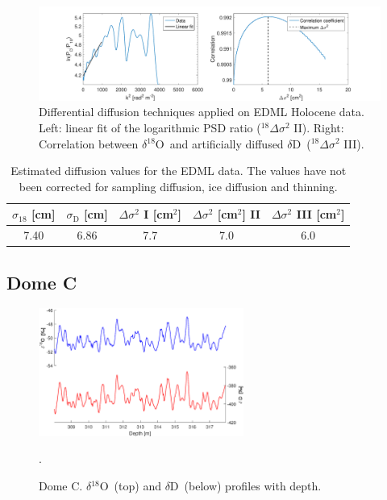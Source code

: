 \documentclass[11pt, draftcls, onecolumn]{IEEEtran} %
\numberwithin{equation}{section}
\numberwithin{table}{section}
\numberwithin{figure}{section}
\newcommand{\delOx}{$\delta{}^{18}\mathrm{O}$}
\newcommand{\delD}{$\delta\mathrm{D}$}
\begin{document}
\begin{appendices}
\begin{figure}[H]
	\vspace*{2mm}
	\begin{center}
		\includegraphics[width=1\textwidth]{Figure_44}
		\caption{Differential diffusion techniques applied on EDML Holocene data. 
			Left: linear fit of the logarithmic PSD ratio ($^{18}\Delta\sigma^2$ II). Right: 
			Correlation between \delOx~and artificially diffused \delD~($^{18}\Delta\sigma^2$ III).}  \label{fig:EDML_fig_2}
	\end{center}
\end{figure}

\begin{table}[H]
	\center
	\caption{Estimated diffusion values for the EDML data.
		The values have not been corrected for sampling diffusion, ice diffusion and thinning.}
	\label{EDML}
	\begin{tabular}{c c c c c} 
		\toprule
		$\sigma_{18}$ [cm] & $\sigma_\mathrm{D}$ [cm] & $\Delta\sigma^2$ I [cm$^2$] & $\Delta\sigma^2$ [cm$^2$] II & $\Delta\sigma^2$ III [cm$^2$] \\
		\midrule
 		 7.40 &   6.86 &     7.7 &     7.0 &     6.0 \\
		\bottomrule		
	\end{tabular}
\end{table}


\clearpage
\subsection{Dome C}

\begin{figure}[H]
	\vspace*{2mm}
	\begin{center}
		\includegraphics[width=0.6\textwidth]{Figure_45}
		\caption{Dome C. \delOx~(top) and \delD~(below) profiles with depth.}  \label{fig:DomeC_holo}.
	\end{center}
\end{figure}


\end{appendices}
\end{document}
